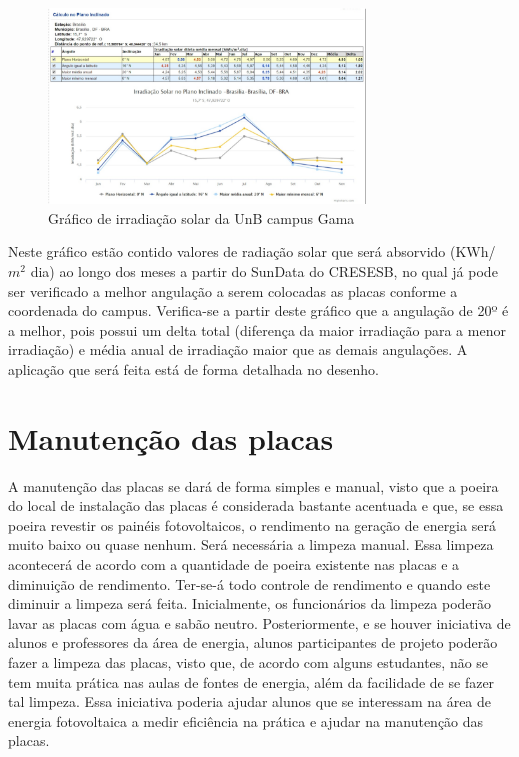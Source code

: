 \begin{figure}[!h]
\centering
\includegraphics[width=0.75\textwidth]{figuras/planoinclinado.png}
\caption{Gráfico de irradiação solar da UnB campus Gama}
\label{fig:planoinclinado}
\end{figure}

Neste gráfico estão contido valores de radiação solar que será absorvido (KWh/$m^{2}$ dia) ao longo dos meses a partir do SunData do CRESESB, no qual já pode ser verificado a melhor angulação a serem colocadas as placas conforme a coordenada do campus. Verifica-se a partir deste gráfico que a angulação de 20º é a melhor, pois possui um delta total  (diferença da maior irradiação para a menor irradiação) e média anual de irradiação maior que as demais angulações. A aplicação que será feita está de forma detalhada no desenho.

\section{Manutenção das placas}

A manutenção das placas se dará de forma simples e manual, visto que a poeira do local de instalação das placas é considerada bastante acentuada e que, se essa poeira revestir os painéis fotovoltaicos, o rendimento na geração de energia será muito baixo ou quase nenhum. Será necessária a limpeza manual. Essa limpeza acontecerá de acordo com a quantidade de poeira existente nas placas e a diminuição de rendimento. Ter-se-á todo controle de rendimento e quando este diminuir a limpeza será feita. Inicialmente, os funcionários da limpeza poderão lavar as placas com água e sabão neutro. Posteriormente, e se houver iniciativa de alunos e professores da área de energia, alunos participantes de projeto poderão fazer a limpeza das placas, visto que, de acordo com alguns estudantes, não se tem muita prática nas aulas de fontes de energia, além da facilidade de se fazer tal limpeza. Essa iniciativa poderia ajudar alunos que se interessam na área de energia fotovoltaica a medir eficiência na prática e ajudar na manutenção das placas.

